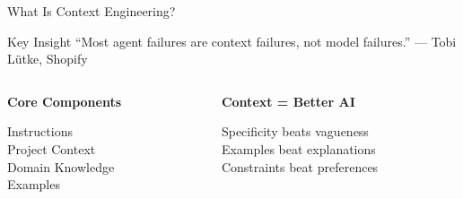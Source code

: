 \documentclass[aspectratio=169]{beamer}
\begin{document}
\begin{frame}{What Is Context Engineering?}
  \begin{block}{Key Insight\supercite{lutke2024context}}
    ``Most agent failures are context failures, not model failures.'' --- Tobi Lütke, Shopify
  \end{block}

  \vspace{0.5cm}

  \begin{columns}[T]
    \begin{column}{0.48\textwidth}
      \centering
      \large\bfseries
      \textcolor{conesaTeal}{Core Components}

      \vspace{0.5cm}
      \normalsize
      Instructions\\
      Project Context\\
      Domain Knowledge\\
      Examples
    \end{column}
    \begin{column}{0.48\textwidth}
      \centering
      \large\bfseries
      \textcolor{conesaOrange}{Context = Better AI}

      \vspace{0.5cm}
      \normalsize
      Specificity beats vagueness\\
      Examples beat explanations\\
      Constraints beat preferences
    \end{column}
  \end{columns}
\end{frame}
\end{document}
